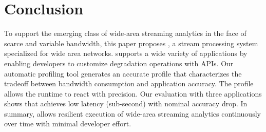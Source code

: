 \section{Conclusion}
\label{sec:conclusion}

To support the emerging class of wide-area streaming analytics in the face of
scarce and variable bandwidth, this paper proposes \sysname{}, a stream
processing system specialized for wide area networks. \sysname{} supports a wide
variety of applications by enabling developers to customize degradation
operations with \maybe{} APIs. Our automatic profiling tool generates an
accurate profile that characterizes the tradeoff between bandwidth consumption and application
accuracy. The profile allows the runtime to react with precision. Our evaluation
with three applications shows that \sysname{} achieves low latency (sub-second)
with nominal accuracy drop. In summary, \sysname{} allows resilient execution of
wide-area streaming analytics continuously over time with minimal developer
effort.

